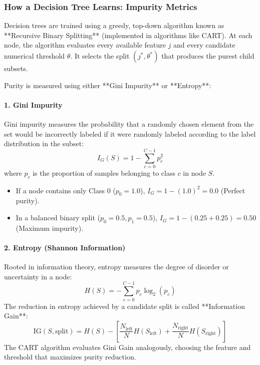 \subsubsection{How a Decision Tree Learns: Impurity Metrics}
Decision trees are trained using a greedy, top-down algorithm known as **Recursive Binary Splitting** (implemented in algorithms like CART). At each node, the algorithm evaluates every available feature $j$ and every candidate numerical threshold $\theta$. It selects the split $(j^*, \theta^*)$ that produces the purest child subsets.

Purity is measured using either **Gini Impurity** or **Entropy**:

\paragraph{1. Gini Impurity}
Gini impurity measures the probability that a randomly chosen element from the set would be incorrectly labeled if it were randomly labeled according to the label distribution in the subset:
\begin{equation}
I_G(S) = 1 - \sum_{c=0}^{C-1} p_c^2\label{eq:gini_def}
\end{equation}
where $p_c$ is the proportion of samples belonging to class $c$ in node $S$.
\begin{itemize}
    \item If a node contains only Class 0 ($p_0 = 1.0$), $I_G = 1 - (1.0)^2 = \mathbf{0.0}$ (Perfect purity).
    \item In a balanced binary split ($p_0 = 0.5, p_1 = 0.5$), $I_G = 1 - (0.25 + 0.25) = \mathbf{0.50}$ (Maximum impurity).
\end{itemize}

\paragraph{2. Entropy (Shannon Information)}
Rooted in information theory, entropy measures the degree of disorder or uncertainty in a node:
\begin{equation}
H(S) = - \sum_{c=0}^{C-1} p_c \log_2(p_c)\label{eq:entropy_def}
\end{equation}
The reduction in entropy achieved by a candidate split is called **Information Gain**:
\begin{equation}
\text{IG}(S, \text{split}) = H(S) - \left[ \frac{N_{\text{left}}}{N} H(S_{\text{left}}) + \frac{N_{\text{right}}}{N} H(S_{\text{right}}) \right]\label{eq:information_gain}
\end{equation}
The CART algorithm evaluates Gini Gain analogously, choosing the feature and threshold that maximizes purity reduction.

